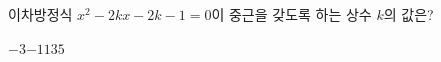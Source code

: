 이차방정식 $x^2-2kx-2k-1=0$이 중근을 갖도록 하는 상수 $k$의 값은?
\begin{choices32}{$-3$}{$-1$}{$1$}{$3$}{$5$}\end{choices32}
